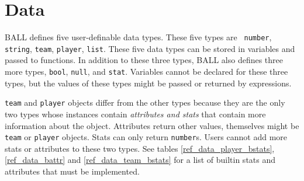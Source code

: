 \section{Data}\label{ref_data}

BALL defines five user-definable data types. These five types are {\tt
  number}, {\tt string}, {\tt team}, {\tt player}, {\tt list}. These
five data types can be stored in variables and passed to functions. In
addition to these three types, BALL also defines three more types,
{\tt bool}, {\tt null}, and {\tt stat}. Variables cannot be declared
for these three types, but the values of these types might be passed
or returned by expressions.

{\tt team} and {\tt player} objects differ from the other types
because they are the only two types whose instances contain 
{\it attributes and stats} that contain more information about the
object. Attributes return other values, themselves might be {\tt team}
or {\tt player} objects. Stats can only return {\tt number}s. Users
cannot add more stats or attributes to these two types. See tables
\ref{ref_data_player_bstats}, \ref{ref_data_battr} and
\ref{ref_data_team_bstats} for a list of builtin stats and attributes
that must be implemented.

